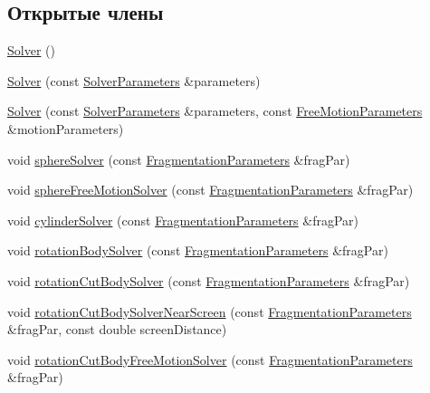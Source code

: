 \subsection*{Открытые члены}
\begin{DoxyCompactItemize}
\item 
\mbox{\hyperlink{class_solver_a9dfe7ae9ce617e8a6398be34284c907a}{Solver}} ()
\item 
\mbox{\hyperlink{class_solver_a27080c3f6ed244ee49f33f7582191363}{Solver}} (const \mbox{\hyperlink{struct_solver_parameters}{Solver\+Parameters}} \&parameters)
\item 
\mbox{\hyperlink{class_solver_a6af37d6f19720654c973f5e5ddef3dfe}{Solver}} (const \mbox{\hyperlink{struct_solver_parameters}{Solver\+Parameters}} \&parameters, const \mbox{\hyperlink{struct_free_motion_parameters}{Free\+Motion\+Parameters}} \&motion\+Parameters)
\item 
void \mbox{\hyperlink{class_solver_a84fbf208353fc2c7426daae963f43a38}{sphere\+Solver}} (const \mbox{\hyperlink{struct_fragmentation_parameters}{Fragmentation\+Parameters}} \&frag\+Par)
\item 
void \mbox{\hyperlink{class_solver_adeb1acdbfb1be98fc7fb74708e7da782}{sphere\+Free\+Motion\+Solver}} (const \mbox{\hyperlink{struct_fragmentation_parameters}{Fragmentation\+Parameters}} \&frag\+Par)
\item 
void \mbox{\hyperlink{class_solver_a698fb6dbd8238df0120eee6027538878}{cylinder\+Solver}} (const \mbox{\hyperlink{struct_fragmentation_parameters}{Fragmentation\+Parameters}} \&frag\+Par)
\item 
void \mbox{\hyperlink{class_solver_ab33207a4b60cd437bcc2f58b04c147ca}{rotation\+Body\+Solver}} (const \mbox{\hyperlink{struct_fragmentation_parameters}{Fragmentation\+Parameters}} \&frag\+Par)
\item 
void \mbox{\hyperlink{class_solver_a76f649c12fed87fcd5a04be0f6c090df}{rotation\+Cut\+Body\+Solver}} (const \mbox{\hyperlink{struct_fragmentation_parameters}{Fragmentation\+Parameters}} \&frag\+Par)
\item 
void \mbox{\hyperlink{class_solver_a6f0cf72490a4ccba78dd13c49c3c1b85}{rotation\+Cut\+Body\+Solver\+Near\+Screen}} (const \mbox{\hyperlink{struct_fragmentation_parameters}{Fragmentation\+Parameters}} \&frag\+Par, const double screen\+Distance)
\item 
void \mbox{\hyperlink{class_solver_a3b238272aed6898fd756e15a41ea0109}{rotation\+Cut\+Body\+Free\+Motion\+Solver}} (const \mbox{\hyperlink{struct_fragmentation_parameters}{Fragmentation\+Parameters}} \&frag\+Par)

\end{DoxyCompactItemize}
